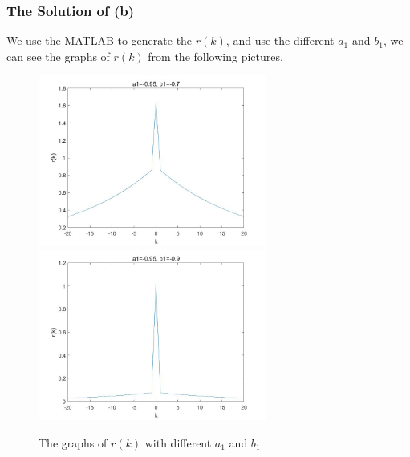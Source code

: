 \documentclass[UTF-8, a4paper, 12pt]{ctexart}
\begin{document}
\subsubsection{The Solution of (b)}

We use the MATLAB to generate the $r(k)$, and use the different $a_1$ and $b_1$, we can see the graphs of $r(k)$ from the following pictures.

\begin{figure}[htbp]
    \centering
    \includegraphics[width=7.5cm]{1/f1.jpg}
    \includegraphics[width=7.5cm]{1/f2.jpg}
    \caption{The  graphs of $r(k)$ with different $a_1$ and $b_1$}
    \label{f1}
\end{figure}
\end{document}
